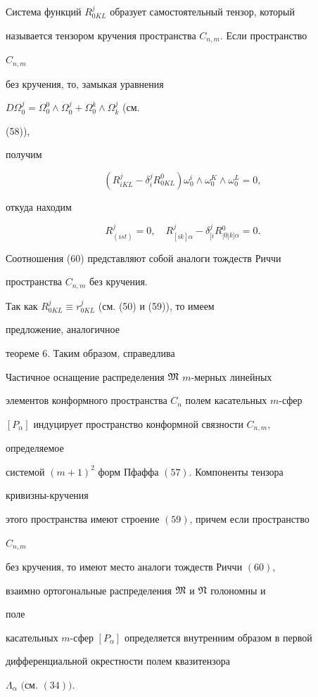  


Система функций $R^j_{0K L}$ образует самостоятельный тензор, который 


называется тензором кручения пространства $C_{n,m}$. Если пространство 


$C_{n,m}$ 


без кручения, то, замыкая уравнения 


$D\Omega^j_0=\Omega^0_0\wedge\Omega^j_0+\Omega^k_0\wedge\Omega^j_k$ (см. 


(58)), 


получим 


$$ 


(R^j_{i K L}-\delta^j_i R^0_{0K L})\omega^i_0\wedge 


\omega^K_0\wedge \omega^L_0=0, 


$$ 


откуда находим 


\begin{equation} 


R^j_{(is t)}=0,\quad R^j_{[i k]\alpha}- 


\delta{}^j_{[i}R{}^0_{|0|k]\alpha}=0. 


\end{equation} 


Соотношения (60) представляют собой аналоги тождеств Риччи 


пространства $C_{n,m}$ без кручения. 


 


Так как $R^j_{0K L}\equiv r^j_{0K L}$ (см. (50) и (59)), то имеем 


предложение, аналогичное 


теореме 6. Таким образом, справедлива 


 


\begin{thm} 


Частичное оснащение распределения $\frak M$\; $m$-мерных линейных 


элементов конформного пространства $C_n$ полем касательных $m$-сфер 


$[P_\alpha]$ индуцирует пространство конформной связности $C_{n,m}$, 


определяемое 


системой $(m+1)^2$ форм Пфаффа $(57)$. Компоненты тензора 


кривизны-кручения 


этого пространства имеют строение $(59)$, причем если пространство 


$C_{n,m}$ 


без кручения, то имеют место аналоги тождеств Риччи $(60)$, 


взаимно ортогональные распределения $\frak M$ и $\frak N$ голономны и 


поле 


касательных $m$-сфер $[P_\alpha]$ определяется внутренним образом в первой 


дифференциальной окрестности полем квазитензора 


$\Lambda_\alpha$ $($см. $(34))$. 


\end{thm} 


